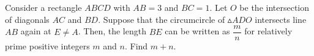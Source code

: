 Consider a rectangle $ABCD$ with $AB = 3$ and $BC = 1$. Let $O$ be the intersection of diagonals $AC$ and $BD$. Suppose that the circumcircle of $ \vartriangle ADO$ intersects line $AB$ again at $E \ne A$. Then, the length $BE$ can be written as $\dfrac{m}{n}$ for relatively prime positive integers $m$ and $n$. Find $m + n$.
